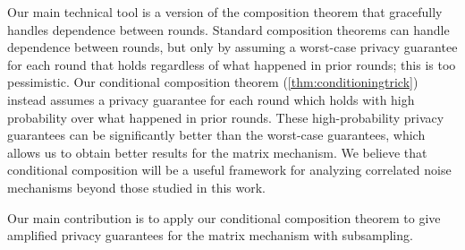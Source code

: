 Our main technical tool is a version of the composition theorem that gracefully handles dependence between rounds. 
Standard composition theorems can handle dependence between rounds, but only by assuming a worst-case privacy guarantee for each round that holds regardless of what happened in prior rounds; this is too pessimistic.
Our conditional composition theorem (\cref{thm:conditioningtrick}) instead assumes a privacy guarantee for each round which holds with high probability over what happened in prior rounds. These high-probability privacy guarantees can be significantly better than the worst-case guarantees, which allows us to obtain better results for the matrix mechanism.  %
We believe that conditional composition will be a useful framework for analyzing correlated noise mechanisms beyond those studied in this work.

Our main contribution is to apply our conditional composition theorem to give amplified privacy guarantees for the matrix mechanism with subsampling.


